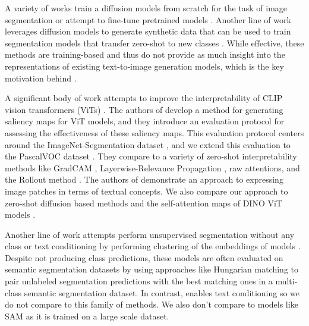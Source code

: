A variety of works train a diffusion models from scratch for the task of image segmentation \cite{amit_segdiff_2022, karazija_diffusion_2024} or attempt to fine-tune pretrained models \cite{baranchuk_label-efficient_2022}. Another line of work leverages diffusion models to generate synthetic data that can be used to train segmentation models that transfer zero-shot to new classes \cite{li_open-vocabulary_2023}. While effective, these methods are training-based and thus do not provide as much insight into the representations of existing text-to-image generation models, which is the key motivation behind \tool{}. 

A significant body of work attempts to improve the interpretability of CLIP vision transformers (ViTs) \cite{dosovitskiy_image_2021}. The authors of \cite{chefer_transformer_2021} develop a method for generating saliency maps for ViT models, and they introduce an evaluation protocol for assessing the effectiveness of these saliency maps. This evaluation protocol centers around the ImageNet-Segmentation dataset \cite{guillaumin_imagenet_2014}, and we extend this evaluation to the PascalVOC dataset \cite{everingham_pascal_2015}. They compare to a variety of zero-shot interpretability methods like GradCAM \cite{selvaraju_grad-cam_2019}, Layerwise-Relevance Propagation \cite{binder_layer-wise_2016}, raw attentions, and the Rollout method \cite{abnar_quantifying_2020}. The authors of \cite{gandelsman_interpreting_2024} demonstrate an approach to expressing image patches in terms of textual concepts. We also compare our approach to zero-shot diffusion based methods \cite{tang_what_2022, wang_diffusion_2024} and the self-attention maps of DINO ViT models \cite{caron_emerging_2021}. 

Another line of work attempts perform unsupervised segmentation without any class or text conditioning by performing clustering of the embeddings of models \cite{cho_picie_2021, hamilton_unsupervised_2022, tian_diffuse_2024}. Despite not producing class predictions, these models are often evaluated on semantic segmentation datasets by using approaches like Hungarian matching \cite{kuhn_hungarian_1955} to pair unlabeled segmentation predictions with the best matching ones in a multi-class semantic segmentation dataset. In contrast, \tool{} enables text conditioning so we do not compare to this family of methods. We also don't compare to models like SAM \cite{kirillov_segment_2023, ravi_sam_2024} as it is trained on a large scale dataset.  %